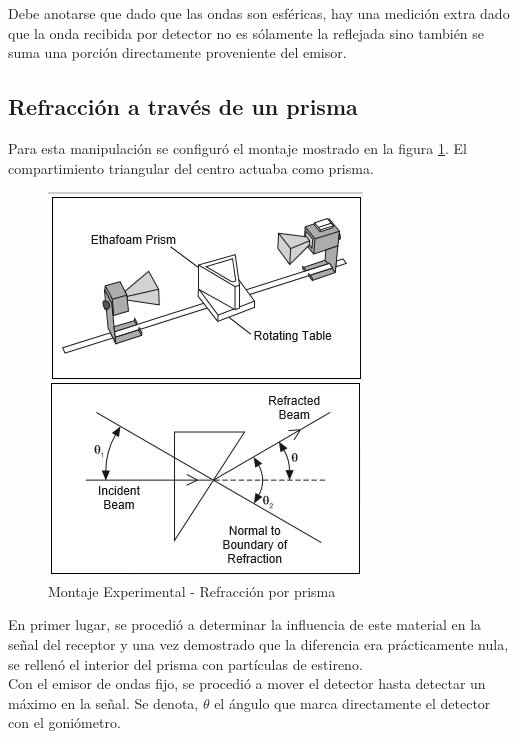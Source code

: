 \documentclass[%
 reprint,
 amsmath,amssymb,
 aps,
]{revtex4-1}
\begin{document}
Debe anotarse que dado que las ondas son esféricas, hay una medición extra dado que la onda recibida por detector no es sólamente la reflejada sino también se suma una porción directamente proveniente del emisor.\\

\subsection{\label{sec:level2}Refracción a través de un prisma}

Para esta manipulación se configuró el montaje mostrado en la figura \ref{fig:refraccion}. El compartimiento triangular del centro actuaba como prisma. \\

\begin{figure}[h!]
\centering
\includegraphics[width=0.7\linewidth]{Pictures/refraccion}
\caption{Montaje Experimental - Refracción por prisma}
\label{fig:refraccion}
\end{figure}
 
En primer lugar, se procedió a determinar la influencia de este material en la señal del receptor y una vez demostrado que la diferencia era prácticamente nula, se rellenó el interior del prisma con partículas de estireno.\\ 

Con el emisor de ondas fijo, se procedió a mover el detector hasta detectar un máximo en la señal.  Se denota, $ \theta $ el ángulo que marca directamente el detector con el goniómetro. \\
\end{document}
